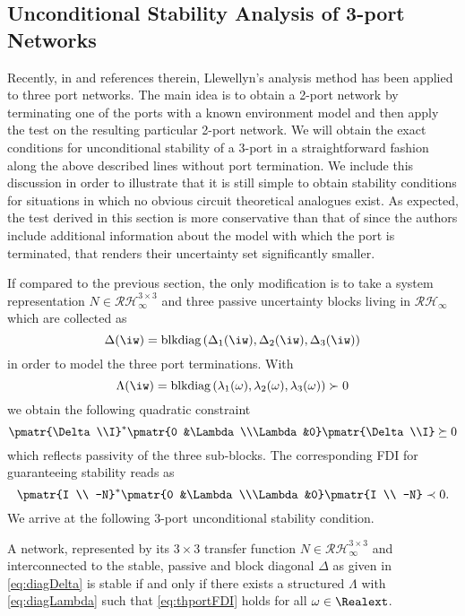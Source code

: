 \subsection{Unconditional Stability Analysis of 3-port Networks}\label{sec:threeport}
Recently, in \cite{khademian} and references therein, Llewellyn's analysis method has been applied to three port networks. The main idea is to obtain a 2-port network by terminating one of the ports with a known environment model and then apply the test on the resulting particular 2-port network. We will obtain the exact conditions for unconditional stability of a 3-port in a straightforward fashion {along the above described lines} without port termination. We include this discussion in order to illustrate that it is still simple to obtain stability conditions for situations in which no obvious circuit theoretical analogues {exist}. As expected, the test derived in this section is more conservative than {that} of \cite{khademian} since the authors include additional information about the model with which the port is terminated, that renders their uncertainty set significantly smaller.

If compared to the previous section, the only modification is to take a system representation $N\in\mathcal{RH}_\infty^{3\times 3}$ and three passive uncertainty blocks living in $\mathcal{RH}_\infty$ which are collected as
\begin{equation}
\Delta(\iw) = \text{blkdiag} \left( \Delta_1(\iw),\Delta_2(\iw),\Delta_3(\iw)\right) 
\label{eq:diagDelta}
\end{equation}
in order to model the three port terminations. With
\begin{equation}
\Lambda(\iw) = \text{blkdiag}\left( \lambda_1(\omega),\lambda_2(\omega),\lambda_3(\omega)\right)\succ 0 
\label{eq:diagLambda}
\end{equation}
we obtain the following quadratic constraint
\[
\pmatr{\Delta\\I}^*\pmatr{0 &\Lambda\\\Lambda &0}\pmatr{\Delta\\I}\succeq 0
\]
which reflects passivity of the three sub-blocks. The corresponding FDI for guaranteeing stability reads as
\begin{equation}
\pmatr{I \\ -N}^*
\pmatr{0 &\Lambda\\\Lambda &0}
\pmatr{I \\ -N} \prec 0.
\label{eq:thportFDI}
\end{equation}
We arrive at the following 3-port unconditional stability condition.
\begin{thm}\label{thm:3portll}

A network, represented by its $3\times3$ transfer function $N \in \mathcal{RH}_\infty^{3\times 3}$ and in\-ter\-connected to the {stable}, passive and block diagonal $\Delta$ as given in \eqref{eq:diagDelta} is stable if and only if there exists a structured $\Lambda$ with \eqref{eq:diagLambda} such that \eqref{eq:thportFDI} holds for all $\omega\in\Realext$.
\end{thm}

